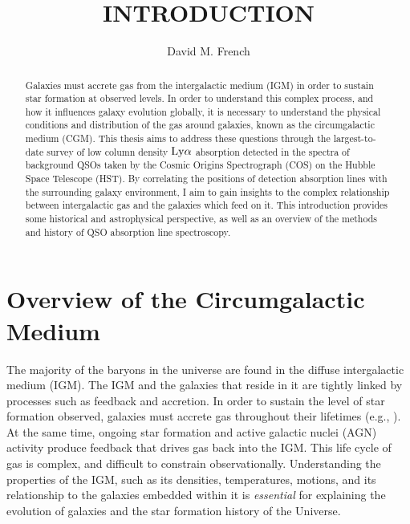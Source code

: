 \documentclass[twocolumn,tighten]{aastex62}
\begin{document}
\title{INTRODUCTION}



\author{David M. French}


\begin{abstract}

Galaxies must accrete gas from the intergalactic medium (IGM) in order to sustain star formation at observed levels. In order to understand this complex process, and how it influences galaxy evolution globally, it is necessary to understand the physical conditions and distribution of the gas around galaxies, known as the circumgalactic medium (CGM). This thesis aims to address these questions through the largest-to-date survey of low column density $\rm Ly\alpha$ absorption detected in the spectra of background QSOs taken by the Cosmic Origins Spectrograph (COS) on the Hubble Space Telescope (HST). By correlating the positions of detection absorption lines with the surrounding galaxy environment, I aim to gain insights to the complex relationship between intergalactic gas and the galaxies which feed on it. This introduction provides some historical and astrophysical perspective, as well as an overview of the methods and history of QSO absorption line spectroscopy.

\end{abstract}



\section{Overview of the Circumgalactic Medium}

The majority of the baryons in the universe are found in the diffuse intergalactic medium (IGM). The IGM and the galaxies that reside in it are tightly linked by processes such as feedback and accretion. In order to sustain the level of star formation observed, galaxies must accrete gas throughout their lifetimes (e.g., \citealt{erb2008, putman2009a, putman2009b, prochaska2009, bauermeister2010, genzel2010}). At the same time, ongoing star formation and active galactic nuclei (AGN) activity produce feedback that drives gas back into the IGM. This life cycle of gas is complex, and difficult to constrain observationally. Understanding the properties of the IGM, such as its densities, temperatures, motions, and its relationship to the galaxies embedded within it is \emph{essential} for explaining the evolution of galaxies and the star formation history of the Universe. 
\end{document}
